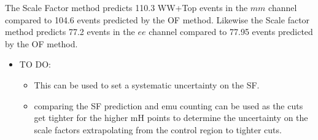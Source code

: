 The Scale Factor method predicts 110.3 WW+Top events in the $mm$ channel 
compared to 104.6 events predicted by the OF method.
Likewise the Scale factor method predicts 77.2 events in the $ee$ channel
compared to 77.95 events predicted by the OF method.

\begin{itemize}
    \item TO DO:
    \begin{itemize}
        \item This can be used to set a systematic uncertainty on the SF.
        \item comparing the SF prediction and emu counting can be used as the cuts get tighter for the higher mH points
to determine the uncertainty on the scale factors extrapolating from the control region to tighter cuts.
    \end{itemize}
\end{itemize}

